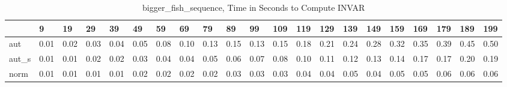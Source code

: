 \begin{table}
\caption{bigger_fish_sequence, Time in Seconds to Compute INVAR}
\label{bigger_fish_sequence_INVAR_time}
\begin{tabular}{lllllllllllllllllllll}
\toprule
 & 9 & 19 & 29 & 39 & 49 & 59 & 69 & 79 & 89 & 99 & 109 & 119 & 129 & 139 & 149 & 159 & 169 & 179 & 189 & 199 \\
\midrule
aut & 0.01 & 0.02 & 0.03 & 0.04 & 0.05 & 0.08 & 0.10 & 0.13 & 0.15 & 0.13 & 0.15 & 0.18 & 0.21 & 0.24 & 0.28 & 0.32 & 0.35 & 0.39 & 0.45 & 0.50 \\
aut_s & 0.01 & 0.01 & 0.02 & 0.02 & 0.03 & 0.04 & 0.04 & 0.05 & 0.06 & 0.07 & 0.08 & 0.10 & 0.11 & 0.12 & 0.13 & 0.14 & 0.17 & 0.17 & 0.20 & 0.19 \\
norm & 0.01 & 0.01 & 0.01 & 0.01 & 0.02 & 0.02 & 0.02 & 0.02 & 0.03 & 0.03 & 0.03 & 0.04 & 0.04 & 0.05 & 0.04 & 0.05 & 0.05 & 0.06 & 0.06 & 0.06 \\
\bottomrule
\end{tabular}
\end{table}
